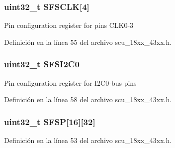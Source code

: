 \subsubsection[{\texorpdfstring{S\+F\+S\+C\+LK}{SFSCLK}}]{ uint32\+\_\+t S\+F\+S\+C\+LK\mbox{[}4\mbox{]}}\hypertarget{struct_l_p_c___s_c_u___t_aba250050801fa2223ecf99d4c9215dc9}{}\label{struct_l_p_c___s_c_u___t_aba250050801fa2223ecf99d4c9215dc9}
Pin configuration register for pins C\+L\+K0-\/3 

Definición en la línea 55 del archivo scu\+\_\+18xx\+\_\+43xx.\+h.

\subsubsection[{\texorpdfstring{S\+F\+S\+I2\+C0}{SFSI2C0}}]{ uint32\+\_\+t S\+F\+S\+I2\+C0}\hypertarget{struct_l_p_c___s_c_u___t_afc428ad89fff4ba3953f7c1ddb745227}{}\label{struct_l_p_c___s_c_u___t_afc428ad89fff4ba3953f7c1ddb745227}
Pin configuration register for I2\+C0-\/bus pins 

Definición en la línea 58 del archivo scu\+\_\+18xx\+\_\+43xx.\+h.

\subsubsection[{\texorpdfstring{S\+F\+SP}{SFSP}}]{ uint32\+\_\+t S\+F\+SP\mbox{[}16\mbox{]}\mbox{[}32\mbox{]}}\hypertarget{struct_l_p_c___s_c_u___t_a6efb02bdfc10d2867b52dee82405e959}{}\label{struct_l_p_c___s_c_u___t_a6efb02bdfc10d2867b52dee82405e959}


Definición en la línea 53 del archivo scu\+\_\+18xx\+\_\+43xx.\+h.

